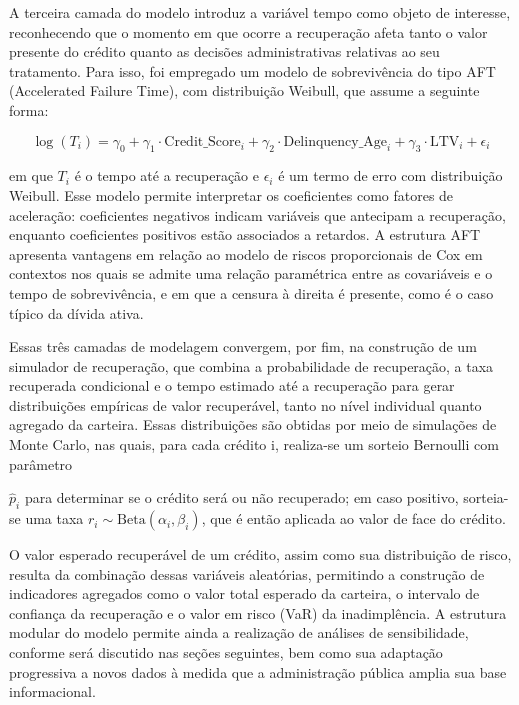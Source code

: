 \documentclass[a4paper,12pt]{article}
\begin{document}
A terceira camada do modelo introduz a variável tempo como objeto de interesse, reconhecendo que o momento em que ocorre a recuperação afeta tanto o valor presente do crédito quanto as decisões administrativas relativas ao seu tratamento. Para isso, foi empregado um modelo de sobrevivência do tipo AFT (Accelerated Failure Time), com distribuição Weibull, que assume a seguinte forma:

\[ \log(T_i) = \gamma_0 + \gamma_1 \cdot \text{Credit\_Score}_i + \gamma_2 \cdot \text{Delinquency\_Age}_i + \gamma_3 \cdot \text{LTV}_i + \epsilon_i \]
 
em que $T_i$ é o tempo até a recuperação e $\epsilon_i$ é um termo de erro com distribuição Weibull. Esse modelo permite interpretar os coeficientes como fatores de aceleração: coeficientes negativos indicam variáveis que antecipam a recuperação, enquanto coeficientes positivos estão associados a retardos. A estrutura AFT apresenta vantagens em relação ao modelo de riscos proporcionais de Cox em contextos nos quais se admite uma relação paramétrica entre as covariáveis e o tempo de sobrevivência, e em que a censura à direita é presente, como é o caso típico da dívida ativa.

Essas três camadas de modelagem convergem, por fim, na construção de um simulador de recuperação, que combina a probabilidade de recuperação, a taxa recuperada condicional e o tempo estimado até a recuperação para gerar distribuições empíricas de valor recuperável, tanto no nível individual quanto agregado da carteira. Essas distribuições são obtidas por meio de simulações de Monte Carlo, nas quais, para cada crédito i, realiza-se um sorteio Bernoulli com parâmetro 

$\hat{p}_{i}$ para determinar se o crédito será ou não recuperado; em caso positivo, sorteia-se uma taxa $r_i \sim \text{Beta}(\alpha_i, \beta_i)$, que é então aplicada ao valor de face do crédito.

O valor esperado recuperável de um crédito, assim como sua distribuição de risco, resulta da combinação dessas variáveis aleatórias, permitindo a construção de indicadores agregados como o valor total esperado da carteira, o intervalo de confiança da recuperação e o valor em risco (VaR) da inadimplência. A estrutura modular do modelo permite ainda a realização de análises de sensibilidade, conforme será discutido nas seções seguintes, bem como sua adaptação progressiva a novos dados à medida que a administração pública amplia sua base informacional.
\end{document}
